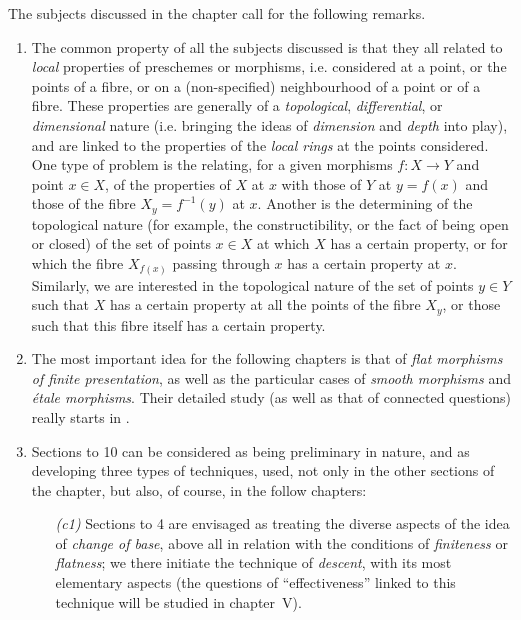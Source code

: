 The subjects discussed in the chapter call for the following remarks.
\begin{enumerate}[label=\emph{(alph*)}]
    \item The common property of all the subjects discussed is that they all related to \emph{local} properties of preschemes or morphisms, i.e. considered at a point, or the points of a fibre, or on a (non-specified) neighbourhood of a point or of a fibre.
        These properties are generally of a \emph{topological}, \emph{differential}, or \emph{dimensional} nature (i.e. bringing the ideas of \emph{dimension} and \emph{depth} into play), and are linked to the properties of the \emph{local rings} at the points considered.
        One type of problem is the relating, for a given morphisms $f:X\to Y$ and point $x\in X$, of the properties of $X$ at $x$ with those of $Y$ at $y=f(x)$ and those of the fibre $X_y=f^{-1}(y)$ at $x$.
        Another is the determining of the topological nature (for example, the constructibility, or the fact of being open or closed) of the set of points $x\in X$ at which $X$ has a certain property, or for which the fibre $X_{f(x)}$ passing through $x$ has a certain property at $x$.
        Similarly, we are interested in the topological nature of the set of points $y\in Y$ such that $X$ has a certain property at all the points of the fibre $X_y$, or those such that this fibre itself has a certain property.
    \item The most important idea for the following chapters is that of \emph{flat morphisms of finite presentation}, as well as the particular cases of \emph{smooth morphisms} and \emph{étale morphisms}.
        Their detailed study (as well as that of connected questions) really starts in .
    \item Sections \textsection{} to 10 can be considered as being preliminary in nature, and as developing three types of techniques, used, not only in the other sections of the chapter, but also, of course, in the follow chapters:
    \begin{enumerate}
        \item[\emph{(c1)}] Sections \textsection{} to 4 are envisaged as treating the diverse aspects of the idea of \emph{change of base}, above all in relation with the conditions of \emph{finiteness} or \emph{flatness};
            we there initiate the technique of \emph{descent}, with its most elementary aspects (the questions of ``effectiveness'' linked to this technique will be studied in chapter~V).

\end{enumerate}
\end{enumerate}
